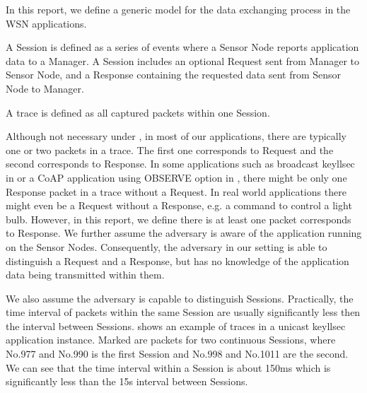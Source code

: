 In this report, we define a generic model for the data exchanging process in the WSN applications.

\begin{definition} \label{Def: Session}
A Session is defined as a series of events where a Sensor Node reports application data to a Manager. A Session includes an optional Request sent from Manager to Sensor Node, and a Response containing the requested data sent from Sensor Node to Manager.
\end{definition}

\begin{definition} \label{Def: Trace}
A trace is defined as all captured packets within one Session.
\end{definition}

Although not necessary under , in most of our applications, there are typically one or two packets in a trace. The first one corresponds to Request and the second corresponds to Response. In some applications such as broadcast keyllsec in  or a CoAP application using OBSERVE option in , there might be only one Response packet in a trace without a Request. In real world applications there might even be a Request without a Response, e.g. a command to control a light bulb. However, in this report, we define there is at least one packet corresponds to Response. We further assume the adversary is aware of the application running on the Sensor Nodes. Consequently, the adversary in our setting is able to distinguish a Request and a Response, but has no knowledge of the application data being transmitted within them.

We also assume the adversary is capable to distinguish Sessions. Practically, the time interval of packets within the same Session are usually significantly less then the interval between Sessions.  shows an example of traces in a unicast keyllsec application instance. Marked are packets for two continuous Sessions, where No.977 and No.990 is the first Session and No.998 and No.1011 are the second. We can see that the time interval within a Session is about 150ms which is significantly less than the 15s interval between Sessions.

